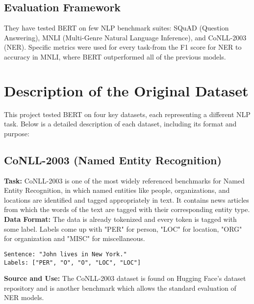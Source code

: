 ﻿\documentclass{article}
\begin{document}
\subsection{Evaluation Framework}
They have tested BERT on few NLP benchmark suites: SQuAD (Question Answering), MNLI (Multi-Genre Natural Language Inference), and CoNLL-2003 (NER). Specific metrics were used for every task-from the F1 score for NER to accuracy in MNLI, where BERT outperformed all of the previous models.

\section{Description of the Original Dataset}
This project tested BERT on four key datasets, each representing a different NLP task. Below is a detailed description of each dataset, including its format and purpose:

\subsection{CoNLL-2003 (Named Entity Recognition)}
\textbf{Task:} CoNLL-2003 is one of the most widely referenced benchmarks for Named Entity Recognition, in which named entities like people, organizations, and locations are identified and tagged appropriately in text. It contains news articles from which the words of the text are tagged with their corresponding entity type.\\
\textbf{Data Format:} The data is already tokenized and every token is tagged with some label. Labels come up with "PER" for person, "LOC" for location, "ORG" for organization and "MISC" for miscellaneous.

\begin{verbatim}
Sentence: "John lives in New York."
Labels: ["PER", "O", "O", "LOC", "LOC"]
\end{verbatim}
\textbf{Source and Use:} The CoNLL-2003 dataset is found on Hugging Face's dataset repository and is another benchmark which allows the standard evaluation of NER models.
\end{document}
